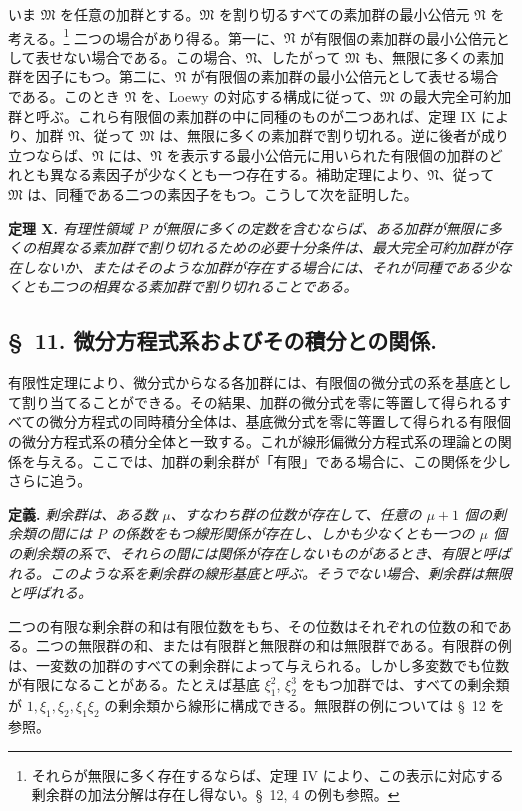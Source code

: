 いま $\mathfrak M$ を任意の加群とする。$\mathfrak M$ を割り切るすべての素加群の最小公倍元 $\mathfrak N$ を考える。\footnote{それらが無限に多く存在するならば、定理 IV により、この表示に対応する剰余群の加法分解は存在し得ない。\S~12, 4 の例も参照。} 二つの場合があり得る。第一に、$\mathfrak N$ が有限個の素加群の最小公倍元として表せない場合である。この場合、$\mathfrak N$、したがって $\mathfrak M$ も、無限に多くの素加群を因子にもつ。第二に、$\mathfrak N$ が有限個の素加群の最小公倍元として表せる場合である。このとき $\mathfrak N$ を、Loewy の対応する構成に従って、$\mathfrak M$ の最大完全可約加群と呼ぶ。これら有限個の素加群の中に同種のものが二つあれば、定理 IX により、加群 $\mathfrak N$、従って $\mathfrak M$ は、無限に多くの素加群で割り切れる。逆に後者が成り立つならば、$\mathfrak N$ には、$\mathfrak N$ を表示する最小公倍元に用いられた有限個の加群のどれとも異なる素因子が少なくとも一つ存在する。補助定理により、$\mathfrak N$、従って $\mathfrak M$ は、同種である二つの素因子をもつ。こうして次を証明した。

\textbf{定理 X.} \emph{有理性領域 $P$ が無限に多くの定数を含むならば、ある加群が無限に多くの相異なる素加群で割り切れるための必要十分条件は、最大完全可約加群が存在しないか、またはそのような加群が存在する場合には、それが同種である少なくとも二つの相異なる素加群で割り切れることである。}

\subsection*{\S~11. 微分方程式系およびその積分との関係.}

有限性定理により、微分式からなる各加群には、有限個の微分式の系を基底として割り当てることができる。その結果、加群の微分式を零に等置して得られるすべての微分方程式の同時積分全体は、基底微分式を零に等置して得られる有限個の微分方程式系の積分全体と一致する。これが線形偏微分方程式系の理論との関係を与える。ここでは、加群の剰余群が「有限」である場合に、この関係を少しさらに追う。

\textbf{定義.} \emph{剰余群は、ある数 $\mu$、すなわち群の位数が存在して、任意の $\mu+1$ 個の剰余類の間には $P$ の係数をもつ線形関係が存在し、しかも少なくとも一つの $\mu$ 個の剰余類の系で、それらの間には関係が存在しないものがあるとき、有限と呼ばれる。このような系を剰余群の線形基底と呼ぶ。そうでない場合、剰余群は無限と呼ばれる。}

二つの有限な剰余群の和は有限位数をもち、その位数はそれぞれの位数の和である。二つの無限群の和、または有限群と無限群の和は無限群である。有限群の例は、一変数の加群のすべての剰余群によって与えられる。しかし多変数でも位数が有限になることがある。たとえば基底 $\xi_1^2$, $\xi_2^3$ をもつ加群では、すべての剰余類が $1,\xi_1,\xi_2,\xi_1\xi_2$ の剰余類から線形に構成できる。無限群の例については \S~12 を参照。

